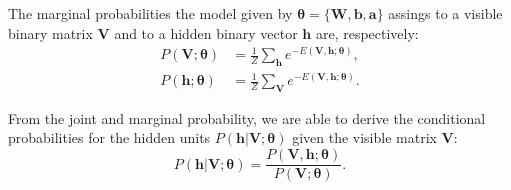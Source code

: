 The marginal probabilities the model given by $\bm{\theta} = \{\mathbf{W}, \mathbf{b}, \mathbf{a}\}$ assings to a visible binary matrix $\mathbf{V}$ and to a hidden binary vector $\mathbf{h}$ are, respectively:
\begin{align}
    \label{eq:app:rsm-marg-prob-visible}
    P(\mathbf{V}; \bm{\theta}) &= \frac{1}{Z} \sum_{\mathbf{h}} e^{-E(\mathbf{V}, \mathbf{h}; \bm{\theta})}, \\
    \label{eq:app:rsm-marg-prob-hidden}
    P(\mathbf{h}; \bm{\theta}) &= \frac{1}{Z} \sum_{\mathbf{V}} e^{-E(\mathbf{V}, \mathbf{h}; \bm{\theta})}.
\end{align}

From the joint and marginal probability, we are able to derive the conditional probabilities for the hidden units $P(\mathbf{h} | \mathbf{V}; \bm{\theta})$ given the visible matrix $\mathbf{V}$:
\begin{equation}
    \label{eq:app:rsm-cond-prob-hidden}
    P(\mathbf{h} | \mathbf{V}; \bm{\theta}) = \frac{P(\mathbf{V}, \mathbf{h}; \bm{\theta})}{P(\mathbf{V}; \bm{\theta})}.
\end{equation}

